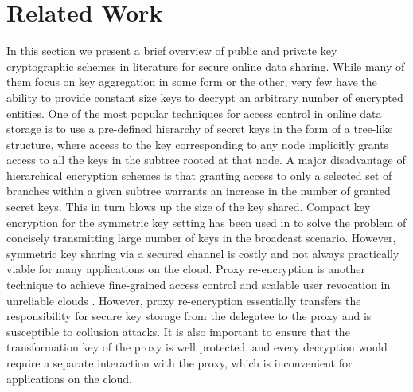 \section{Related Work}
\label{sec:relwork}

In this section we present a brief overview of public and private key cryptographic schemes in literature for secure online data sharing. While many of them focus on key aggregation in some form or the other, very few have the ability to provide constant size keys to decrypt an arbitrary number of encrypted entities. One of the most popular techniques for access control in online data storage is to use a pre-defined hierarchy of secret keys \cite{ateniese2012provably} in the form of a tree-like structure, where access to the key corresponding to any node implicitly grants access to all the keys in the subtree rooted at that node. A major disadvantage of hierarchical encryption schemes is that granting access to only a selected set of branches within a given subtree warrants an increase in the number of granted secret keys. This in turn blows up the size of the key shared. Compact key encryption for the symmetric key setting has been used in \cite{benaloh2009patient} to solve the problem of concisely transmitting  large number of keys in the broadcast scenario. However, symmetric key sharing via a secured channel is costly and not always practically viable for many applications on the cloud. Proxy re-encryption is another technique to achieve fine-grained access control and scalable user revocation in unreliable clouds \cite{ateniese2006improved}. However, proxy re-encryption essentially transfers the responsibility for secure key storage from the delegatee to the proxy and is susceptible to collusion attacks. It is also important to ensure that the transformation key of the proxy is well protected, and every decryption would require a separate interaction with the proxy, which is inconvenient for applications on the cloud.

